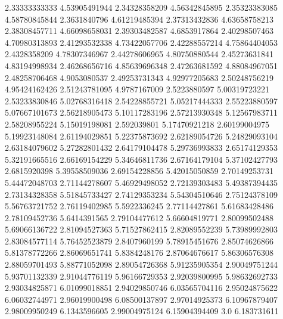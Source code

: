   2.33333333333    4.53905491944
  2.34328358209    4.56342845895
  2.35323383085    4.58780845844
   2.3631840796    4.61219485394
  2.37313432836    4.63658758213
  2.38308457711    4.66098658031
  2.39303482587     4.6853917864
  2.40298507463    4.70980313893
  2.41293532338    4.73422057706
  2.42288557214    4.75864404053
   2.4328358209    4.78307346967
  2.44278606965    4.80750880544
  2.45273631841    4.83194998934
  2.46268656716    4.85639696348
  2.47263681592    4.88084967051
  2.48258706468     4.9053080537
  2.49253731343    4.92977205683
  2.50248756219    4.95424162426
  2.51243781095     4.9787167009
   2.5223880597    5.00319723221
  2.53233830846    5.02768316418
  2.54228855721    5.05217444333
  2.55223880597    5.07667101673
  2.56218905473    5.10117283196
  2.57213930348    5.12567983711
  2.58208955224    5.15019198081
    2.592039801    5.17470921218
  2.60199004975    5.19923148084
  2.61194029851    5.22375873692
  2.62189054726    5.24829093104
  2.63184079602    5.27282801432
  2.64179104478    5.29736993833
  2.65174129353    5.32191665516
  2.66169154229    5.34646811736
  2.67164179104    5.37102427793
   2.6815920398    5.39558509036
  2.69154228856    5.42015050859
  2.70149253731    5.44472048703
  2.71144278607    5.46929498052
  2.72139303483    5.49387394435
  2.73134328358    5.51845733427
  2.74129353234    5.54304510646
  2.75124378109    5.56763721752
  2.76119402985     5.5922336245
  2.77114427861    5.61683428486
  2.78109452736     5.6414391565
  2.79104477612    5.66604819771
  2.80099502488    5.69066136722
  2.81094527363    5.71527862415
  2.82089552239    5.73989992803
  2.83084577114    5.76452523879
   2.8407960199    5.78915451676
  2.85074626866    5.81378772266
  2.86069651741     5.8384248176
  2.87064676617    5.86306576308
  2.88059701493    5.88771052098
  2.89054726368    5.91235905354
  2.90049751244    5.93701132339
  2.91044776119    5.96166729353
  2.92039800995    5.98632692733
  2.93034825871    6.01099018851
  2.94029850746    6.03565704116
  2.95024875622    6.06032744971
  2.96019900498    6.08500137897
  2.97014925373    6.10967879407
  2.98009950249     6.1343596605
  2.99004975124    6.15904394409
            3.0      6.183731611
